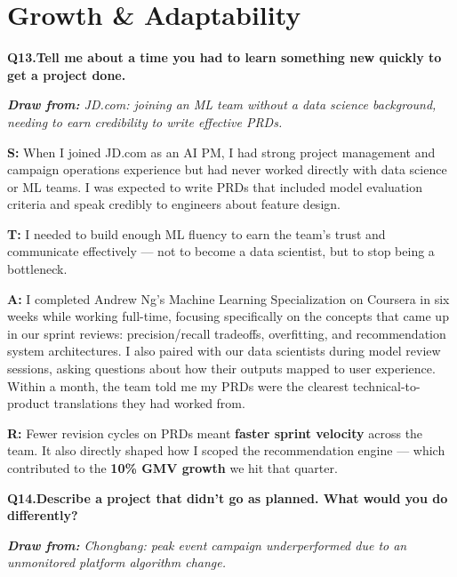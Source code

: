 \documentclass[10pt, letterpaper]{article}
\newcommand{\q}[2]{%
    \smallskip
    \noindent\textbf{\small Q#1.}\quad\textbf{#2}
    \vspace{3pt}
}
\newcommand{\hint}[1]{%
    \begin{notebox}
    \footnotesize\textit{\textbf{Draw from:} #1}
    \end{notebox}
}
\newcommand{\s}[1]{\textbf{\textcolor{starlabel}{S:}} #1}
\newcommand{\ta}[1]{\textbf{\textcolor{starlabel}{T:}} #1}
\newcommand{\ac}[1]{\textbf{\textcolor{starlabel}{A:}} #1}
\newcommand{\res}[1]{\textbf{\textcolor{starlabel}{R:}} #1}
\begin{document}
\section{Growth \& Adaptability}

\q{13}{Tell me about a time you had to learn something new quickly to get a project done.}
\hint{JD.com: joining an ML team without a data science background, needing to earn credibility to write effective PRDs.}

\begin{answerbox}
\footnotesize
\s{When I joined JD.com as an AI PM, I had strong project management and campaign operations experience but had never worked directly with data science or ML teams. I was expected to write PRDs that included model evaluation criteria and speak credibly to engineers about feature design.}

\medskip
\ta{I needed to build enough ML fluency to earn the team's trust and communicate effectively --- not to become a data scientist, but to stop being a bottleneck.}

\medskip
\ac{I completed Andrew Ng's Machine Learning Specialization on Coursera in six weeks while working full-time, focusing specifically on the concepts that came up in our sprint reviews: precision/recall tradeoffs, overfitting, and recommendation system architectures. I also paired with our data scientists during model review sessions, asking questions about how their outputs mapped to user experience. Within a month, the team told me my PRDs were the clearest technical-to-product translations they had worked from.}

\medskip
\res{Fewer revision cycles on PRDs meant \textbf{faster sprint velocity} across the team. It also directly shaped how I scoped the recommendation engine --- which contributed to the \textbf{10\% GMV growth} we hit that quarter.}
\end{answerbox}

\q{14}{Describe a project that didn't go as planned. What would you do differently?}
\hint{Chongbang: peak event campaign underperformed due to an unmonitored platform algorithm change.}
\end{document}
